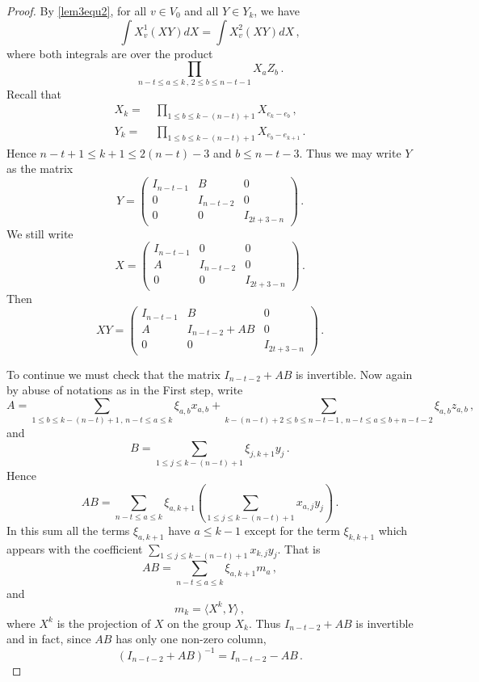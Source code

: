 \documentclass[12pt]{amsart}
\begin{document}
\begin{proof}
By \eqref{lem3equ2}, for all $v \in V_0$ and all $Y\in Y_k$, we have
\[ \int X^1_v(X Y) d X = \int X^2_v(X Y) d X\,,\]
where both integrals are over the product
\[ \prod_{n-t \leq a \leq k\,,\, 2 \leq b \leq n-t-1} X_a Z_ b\,.\]
Recall that
\begin{align*}
X_k = \ & \prod _{1\leq b \leq k-(n-t) + 1 } X_{e_k-e_b}\,,\\
Y_k = \ & \prod _{1 \le b \leq k -(n-t) +1} X _{e_b -e_{k+1}}\,.
\end{align*}
Hence $ n-t+1 \leq k+1 \leq 2(n-t)-3$ and $b\leq n-t-3$. Thus we may write $Y$ as the matrix
\[Y= \left(\begin{array}{ccc} I_{n-t-1} & B & 0 \\ 0 & I_{ n-t-2}&0 \\ 0 &0 &I_{ 2t + 3 -n} \end{array}\right) \,.\]
We still write
\[X = \left(\begin{array}{ccc} I_{n-t-1} & 0 & 0 \\ A & I_{ n-t-2}&0 \\ 0 &0 &I_{ 2t + 3 -n} \end{array}\right) \,.\]
Then
\[ XY = \left(\begin{array}{ccc} I_{n-t-1} & B & 0 \\ A & I_{ n-t-2}+ AB&0 \\ 0 &0 &I_{ 2t + 3 -n} \end{array}\right) \,.\]

To continue we must check that the matrix $ I_{ n-t-2}+ AB$ is invertible.  Now again by abuse of notations as in the First step, write
\[ A = \sum_{1\leq b\leq k -(n-t) +1\,,\, n-t \leq a \leq k} \xi_{ a,b} x_{a,b}+ \sum_{k-(n-t)+2 \leq b \leq n-t-1\,,\, n-t \leq a \leq b+ n-t-2} \xi_{a,b} z_{a,b}\,,\]
and
\[ B= \sum _{ 1 \leq j \leq k-(n-t)+1}\xi_{j, k+1} y_j \,.\]
Hence 
\[ AB=\sum _{n-t \leq a \leq k} \xi_{a, k+1} \left( \sum _{1 \leq j\leq k -(n-t)+1}  x_{a,j} y_j \right) \,. \]
In this sum all the terms $\xi_{a,k+1}$ have $a \leq k-1$ except for the term $\xi_{k,k+1}$ which appears with the coefficient $ \sum _{1 \leq j\leq k -(n-t)+1}  x_{k,j} y_j$. 
That is
\[ AB = \sum _{ n-t\leq a \leq k} \xi_{a,k+1} m_a\,, \]
and
\[ m_k = \langle X^k,Y\rangle\,,\]
where $X^k$ is the projection of $X$ on the group $X_k$. 
Thus $I_{ n-t-2}+ AB$ is invertible and in fact, since $AB$ has only one non-zero column, 
\[ (I_{n-t-2}+ AB)^{-1} = I_{n-t-2}- AB\,.\]


\end{proof}
\end{document}
